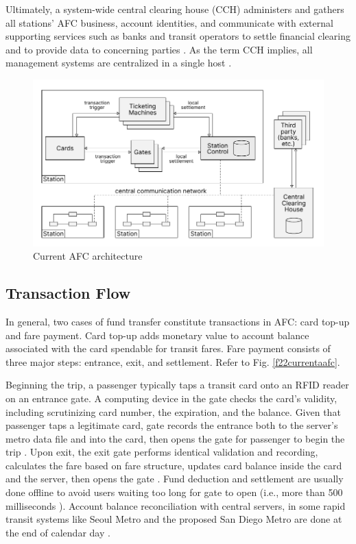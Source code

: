 \documentclass[a4paper,12pt,oneside, utf8x]{report}
\begin{document}
Ultimately, a system-wide central clearing house (CCH) administers and gathers all stations’ AFC business, account identities, and communicate with external supporting services such as banks and transit operators \cite{a4,a11} to settle financial clearing and to provide data to concerning parties \cite{a13,a15,a18}. As the term CCH implies, all management systems are centralized in a single host \cite{a4,a15}.

    \begin{figure}[H]
        \centering
        \includegraphics[width=.96\textwidth]{figures/tafc.pdf}
        \caption{Current AFC architecture}
        \label{f21currentaafc}
    \end{figure}
    
\subsection{Transaction Flow}
In general, two cases of fund transfer constitute transactions in AFC: card top-up and fare payment. Card top-up adds monetary value to account balance associated with the card spendable for transit fares. Fare payment consists of three major steps: entrance, exit, and settlement. Refer to Fig. \ref{f22currentaafc}. 

Beginning the trip, a passenger typically taps a transit card onto an RFID reader on an entrance gate. A computing device in the gate checks the card’s validity, including scrutinizing card number, the expiration, and the balance. Given that passenger taps a legitimate card, gate records the entrance both to the server’s metro data file and into the card, then opens the gate for passenger to begin the trip \cite{a6}. Upon exit, the exit gate performs identical validation and recording, calculates the fare based on fare structure, updates card balance inside the card and the server, then opens the gate \cite{a13}. Fund deduction and settlement are usually done offline to avoid users waiting too long for gate to open (i.e., more than 500 milliseconds \cite{a14}). Account balance reconciliation with central servers, in some rapid transit systems like Seoul Metro and the proposed San Diego Metro are done at the end of calendar day \cite{a13,a15}.
\end{document}

